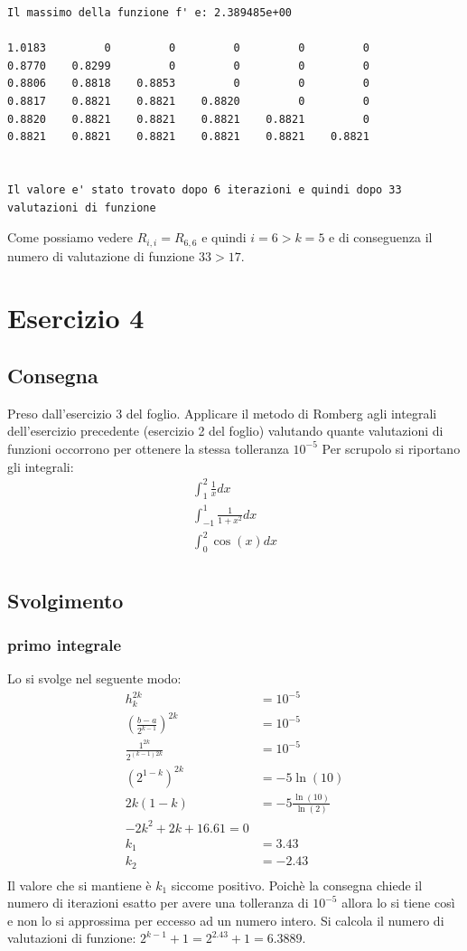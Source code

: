 \documentclass[11pt]{article}
\begin{document}
\begin{lstlisting}[style=console]
Il massimo della funzione f' e: 2.389485e+00
	
1.0183         0         0         0         0         0
0.8770    0.8299         0         0         0         0
0.8806    0.8818    0.8853         0         0         0
0.8817    0.8821    0.8821    0.8820         0         0
0.8820    0.8821    0.8821    0.8821    0.8821         0
0.8821    0.8821    0.8821    0.8821    0.8821    0.8821


Il valore e' stato trovato dopo 6 iterazioni e quindi dopo 33 valutazioni di funzione
\end{lstlisting}
Come possiamo vedere $R_{i,i}=R_{6,6}$ e quindi $i=6>k=5$ e di conseguenza il numero di valutazione di funzione $33>17$.
\section{Esercizio 4}
\subsection{Consegna}
Preso dall'esercizio 3 del foglio.
Applicare il metodo di Romberg agli integrali dell’esercizio precedente (esercizio 2 del foglio) valutando quante valutazioni di funzioni occorrono per ottenere la stessa tolleranza $10^{-5}$
Per scrupolo si riportano gli integrali:
\begin{align*}
	\int^2_1\frac{1}{x}dx\\
	\int^1_{-1}\frac{1}{1+x^2}dx\\
	\int^2_0\cos(x)dx\\
\end{align*}
\subsection{Svolgimento}
\subsubsection{primo integrale}
Lo si svolge nel seguente modo:
\begin{align*}
	h_k^{2k}&= 10^{-5} \\
\left(\frac{b-a}{2^{k-1}}\right)^{2k} &=10^{-5}\\
\frac{1^{2k}}{2^{(k-1)2k}} &= 10^{-5}\\
(2^{1-k})^{2k}&=-5\ln(10)\\
2k(1-k)&= -5\frac{\ln(10)}{\ln(2)}\\
-2k^2+2k+ 16.61=0 \\
k_1&=3.43\\
k_2&=-2.43\\
\end{align*} 
Il valore che si mantiene è $k_1$ siccome positivo. Poichè la consegna chiede il numero di iterazioni esatto per avere una tolleranza di $10^{-5}$ allora lo si tiene così e non lo si approssima per eccesso ad un numero intero. Si calcola il numero di valutazioni di funzione: $2^{k-1}+1=2^{2.43}+1=6.3889$.
\end{document}
